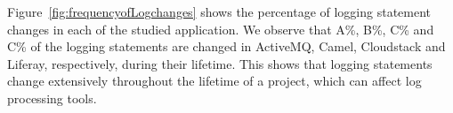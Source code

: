 %
%	


Figure~\ref{fig:frequencyofLogchanges} shows the percentage of logging statement changes in each of the studied application. We observe that A\%, B\%, C\% and C\% of the logging statements are changed in ActiveMQ, Camel, Cloudstack and Liferay, respectively, during their lifetime. This shows that logging statements change extensively throughout the lifetime of a project, which can affect log processing tools.

